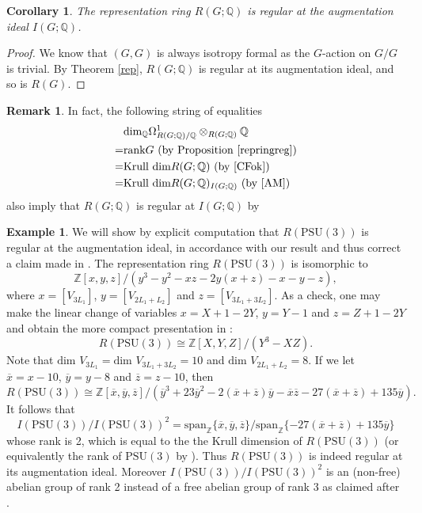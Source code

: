 \documentclass[11pt]{amsart}
\theoremstyle{plain}
\newtheorem{corollary}[theorem]{Corollary}
\theoremstyle{definition}
\newtheorem{example}[theorem]{Example}
\newtheorem{remark}[theorem]{Remark}
\begin{document}
\begin{corollary}\label{regrep}
	The representation ring $R(G; \mathbb{Q})$ is regular at the augmentation ideal $I(G; \mathbb{Q})$. 
\end{corollary}
\begin{proof}
	We know that $(G, G)$ is always isotropy formal as the $G$-action on $G/G$ is trivial. By Theorem \ref{rep}, $R(G; \mathbb{Q})$ is regular at its augmentation ideal, and so is $R(G)$. 
\end{proof}
\begin{remark}
	In fact, the following string of equalities
	\begin{align*}
		&\text{dim}_\mathbb{Q}\Omega^1_{R(G; \mathbb{Q})/\mathbb{Q}}\otimes_{R(G; \mathbb{Q})}\mathbb{Q}\\
		=&\text{rank}G\ (\text{by Proposition \ref{repringreg}})\\
		=&\text{Krull dim} R(G; \mathbb{Q})\ (\text{by \cite[Lemma 7.12]{CFok}})\\
		=&\text{Krull dim} R(G; \mathbb{Q})_{I(G; \mathbb{Q})}\ (\text{by \cite[Corollary 11.27]{AM}})
	\end{align*} 	
	also imply that $R(G; \mathbb{Q})$ is regular at $I(G; \mathbb{Q})$ by \cite[Corollary 3.7]{ABC+}
\end{remark}
\begin{example}
	We will show by explicit computation that $R(\text{PSU}(3))$ is regular at the augmentation ideal, in accordance with our result and thus correct a claim made in \cite{Ho}. The representation ring $R(\text{PSU}(3))$ is isomorphic to 
	\[\mathbb{Z}[x, y, z]/(y^3-y^2-xz-2y(x+z)-x-y-z), \]
	where $x=[V_{3L_1}]$, $y=[V_{2L_1+L_2}]$ and $z=[V_{3L_1+3L_2}]$. As a check, one may make the linear change of variables $x= X+1-2Y$, $y=Y-1$ and $z=Z+1-2Y$ and obtain the more compact presentation in \cite[Lemma 7.1]{BZ}:
	\[R(\text{PSU}(3))\cong \mathbb{Z}[X, Y, Z]/(Y^3-XZ).\]
	Note that $\text{dim }V_{3L_1}=\text{dim }V_{3L_1+3L_2}=10$ and $\text{dim }V_{2L_1+L_2}=8$. If we let $\overline{x}=x-10$, $\overline{y}=y-8$ and $\overline{z}=z-10$, then 
	\[R(\text{PSU}(3))\cong\mathbb{Z}[\overline{x}, \overline{y}, \overline{z}]/(\overline{y}^3+23\overline{y}^2-2(\overline{x}+\overline{z})\overline{y}-\overline{x}\overline{z}-27(\overline{x}+\overline{z})+135\overline{y}).\]
	It follows that 
	\[I(\text{PSU}(3))/I(\text{PSU}(3))^2=\text{span}_\mathbb{Z}\{\overline{x}, \overline{y}, \overline{z}\}/\text{span}_\mathbb{Z}\{-27(\overline{x}+\overline{z})+135\overline{y}\}\]
	whose rank is 2, which is equal to the the Krull dimension of $R(\text{PSU}(3))$ (or equivalently the rank of $\text{PSU}(3)$ by \cite[Lemma 7.12(ii)]{CFok}). Thus $R(\text{PSU}(3))$ is indeed regular at its augmentation ideal. Moreover $I(\text{PSU}(3))/I(\text{PSU}(3))^2$ is an (non-free) abelian group of rank 2 instead of a free abelian group of rank 3 as claimed after \cite[Proof of Lemma 4.2]{Ho}. 
\end{example}
\end{document}
